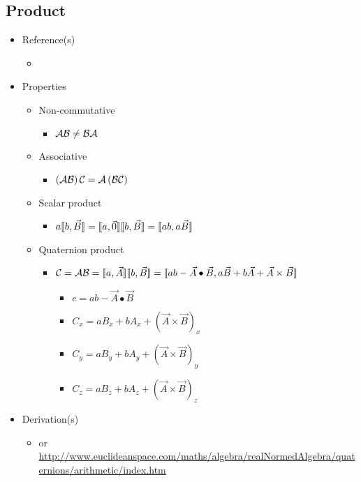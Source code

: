 \documentclass[letterpaper]{article}
\begin{document}
	\subsection{Product}
	\begin{itemize}
		\item Reference(s)
			\begin{itemize}
				\item \cite{Altmann1986}
			\end{itemize}
		\item Properties
			\begin{itemize}
				\item Non-commutative
					\begin{itemize}
						\item $\mathcal{A}\mathcal{B} \neq \mathcal{B}\mathcal{A}$
					\end{itemize}
				\item Associative
					\begin{itemize}
						\item $\left(\mathcal{AB}\right)\mathcal{C}=\mathcal{A}\left(\mathcal{BC}\right)$
					\end{itemize}
				\item Scalar product
					\begin{itemize}
						\item $a\llbracket b, \vec{B} \rrbracket = \llbracket a, \vec{0} \rrbracket\llbracket b, \vec{B} \rrbracket=\llbracket ab, a\vec{B} \rrbracket$
					\end{itemize}
				\item Quaternion product
					\begin{itemize}
						\item $\mathcal{C} = \mathcal{AB} = \llbracket a, \vec{A} \rrbracket\llbracket b, \vec{B} \rrbracket = \llbracket ab-\vec{A}\bullet\vec{B}, a\vec{B}+b\vec{A}+\vec{A}\times\vec{B} \rrbracket$
							\begin{itemize}
								\item $c = ab-\vec{A}\bullet\vec{B}$
								\item $C_x = aB_x + bA_x + \left(\vec{A}\times\vec{B}\right)_x$
								\item $C_y = aB_y + bA_y + \left(\vec{A}\times\vec{B}\right)_y$
								\item $C_z = aB_z + bA_z + \left(\vec{A}\times\vec{B}\right)_z$
							\end{itemize}
					\end{itemize}
			\end{itemize}
		\item Derivation(s)
			\begin{itemize}
				\item \cite{Altmann1986} or \url{http://www.euclideanspace.com/maths/algebra/realNormedAlgebra/quaternions/arithmetic/index.htm}
			\end{itemize}
	\end{itemize}
	
\end{document}
